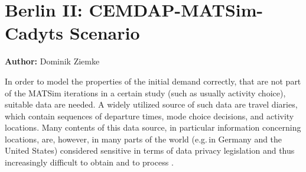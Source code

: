 \section{Berlin II: CEMDAP-MATSim-Cadyts Scenario}
\label{sec:berlinII}
\hfill \textbf{Author:} Dominik Ziemke


In order to model the properties of the initial demand correctly, that are not part of the MATSim iterations in a certain study (such as usually activity choice), suitable data are needed. A widely utilized source of such data are travel diaries, which contain sequences of departure times, mode choice decisions, and activity locations.
Many contents of this data source, in particular information concerning locations, are, however, in many parts of the world (e.g.\,in Germany and the United States) considered sensitive in terms of data privacy legislation and thus increasingly difficult to obtain and to process \citep{ZiemkeNagelBhat2015IntegratingCemdapMatsimTransferabilityTRB}.

